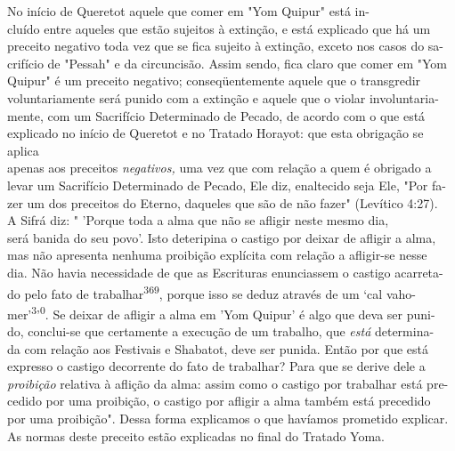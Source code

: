 No início de Queretot aquele que comer em "Yom Quipur" está in-\\
cluído entre aqueles que estão sujeitos à extinção, e está explicado que
há um\\
preceito negativo toda vez que se fica sujeito à extinção, exceto nos
casos do sa-\\
crifício de "Pessah" e da circuncisão. Assim sendo, fica claro que comer
em "Yom\\
Quipur" é um preceito negativo; conseqüentemente aquele que o
transgredir\\
voluntariamente será punido com a extinção e aquele que o violar
involuntaria-\\
mente, com um Sacrifício Determinado de Pecado, de acordo com o que
está\\
explicado no início de Queretot e no Tratado Horayot: que esta obrigação
se aplica\\
apenas aos preceitos \emph{negativos,} uma vez que com relação a quem é
obrigado a\\
levar um Sacrifício Determinado de Pecado, Ele diz, enaltecido seja Ele,
"Por fa-\\
zer um dos preceitos do Eterno, daqueles que são de não fazer" (Levítico
4:27).\\
A Sifrá diz: " 'Porque toda a alma que não se afligir neste mesmo dia,\\
será banida do seu povo'. Isto deteripina o castigo por deixar de
afligir a alma,\\
mas não apresenta nenhuma proibição explícita com relação a afligir-se
nesse\\
dia. Não havia necessidade de que as Escrituras enunciassem o castigo
acarreta-\\
do pelo fato de trabalhar\textsuperscript{369}, porque isso se deduz
através de um `cal vaho-\\
mer'\textsuperscript{3}'\textsuperscript{0}. Se deixar de afligir a alma
em 'Yom Quipur' é algo que deva ser puni-\\
do, conclui-se que certamente a execução de um trabalho, que \emph{está}
determina-\\
da com relação aos Festivais e Shabatot, deve ser punida. Então por que
está\\
expresso o castigo decorrente do fato de trabalhar? Para que se derive
dele a\\
\emph{proibição} relativa à aflição da alma: assim como o castigo por
trabalhar está pre-\\
cedido por uma proibição, o castigo por afligir a alma também está
precedido\\
por uma proibição". Dessa forma explicamos o que havíamos prometido
explicar.\\
As normas deste preceito estão explicadas no final do Tratado Yoma.

